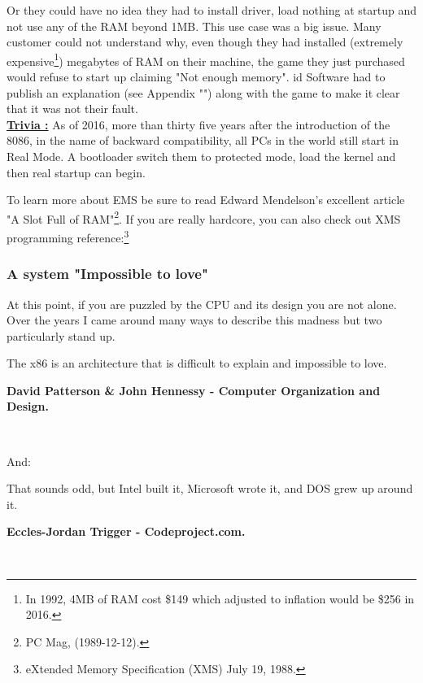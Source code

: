 \documentclass[book.tex]{subfiles}
\begin{document}
Or they could have no idea they had to install driver, load nothing at startup and not use any of the RAM beyond 1MB. This use case was a big issue. Many customer could not understand why, even though they had installed (extremely expensive\footnote{In 1992, 4MB of RAM cost \$149 which adjusted to inflation would be \$256 in 2016.}) megabytes of RAM on their machine, the game they just purchased would refuse to start up claiming "Not enough memory". id Software had to publish an explanation (see Appendix "") along with the game to make it clear that it was not their fault.\\

\textbf{\underline{Trivia :}}  As of 2016, more than thirty five years after the introduction of the 8086, in the name of backward compatibility, all PCs in the world still start in Real Mode. A bootloader switch them to protected mode, load the kernel and then real startup can begin.

\bigskip
To learn more about EMS be sure to read Edward Mendelson's excellent article "A Slot Full of RAM"\footnote{PC Mag, (1989-12-12).}. If you are really hardcore, you can also check out XMS programming reference:\footnote{eXtended Memory Specification (XMS) July 19, 1988.}\\
\par

\subsubsection{A system "Impossible to love"}
At this point, if you are puzzled by the CPU and its design you are not alone. Over the years I came around many ways to describe this madness but two particularly stand up.\\
\par
 \begin{fancyquotes}
   The x86 is an architecture that is difficult to explain and impossible to love.\\
   \par
\textbf{David Patterson \& John Hennessy - Computer Organization and Design.}
 \end{fancyquotes}\\
\par
And:\\
\par
 \begin{fancyquotes}
    That sounds odd, but Intel built it, Microsoft wrote it, and DOS grew up around it.\\
   \par
\textbf{Eccles-Jordan Trigger - Codeproject.com.}
 \end{fancyquotes}\\
\end{document}
